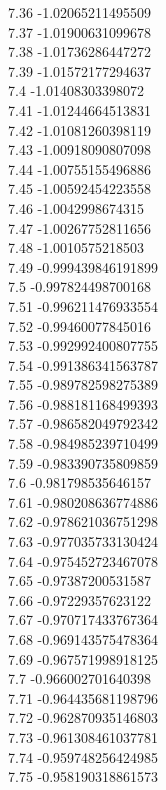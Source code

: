 {7.36	-1.02065211495509\\
7.37	-1.01900631099678\\
7.38	-1.01736286447272\\
7.39	-1.01572177294637\\
7.4	-1.01408303398072\\
7.41	-1.01244664513831\\
7.42	-1.01081260398119\\
7.43	-1.00918090807098\\
7.44	-1.00755155496886\\
7.45	-1.00592454223558\\
7.46	-1.0042998674315\\
7.47	-1.00267752811656\\
7.48	-1.0010575218503\\
7.49	-0.999439846191899\\
7.5	-0.997824498700168\\
7.51	-0.996211476933554\\
7.52	-0.99460077845016\\
7.53	-0.992992400807755\\
7.54	-0.991386341563787\\
7.55	-0.989782598275389\\
7.56	-0.988181168499393\\
7.57	-0.986582049792342\\
7.58	-0.984985239710499\\
7.59	-0.983390735809859\\
7.6	-0.981798535646157\\
7.61	-0.980208636774886\\
7.62	-0.978621036751298\\
7.63	-0.977035733130424\\
7.64	-0.975452723467078\\
7.65	-0.97387200531587\\
7.66	-0.97229357623122\\
7.67	-0.970717433767364\\
7.68	-0.969143575478364\\
7.69	-0.967571998918125\\
7.7	-0.966002701640398\\
7.71	-0.964435681198796\\
7.72	-0.962870935146803\\
7.73	-0.961308461037781\\
7.74	-0.959748256424985\\
7.75	-0.958190318861573\\
}
